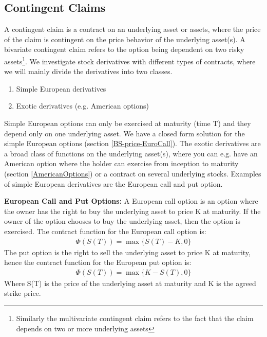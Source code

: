 
\subsection{Contingent Claims}
A contingent claim is a contract on an underlying asset or assets, where the price of the claim is contingent on the price behavior of the underlying asset(s). A bivariate contingent claim refers to the option being dependent on two risky assets\footnote{Similarly the multivariate contingent claim refers to the fact that the claim depends on two or more underlying assets}. We investigate stock derivatives with different types of contracts, where we will mainly divide the derivatives into two classes. 
\begin{enumerate}
\item Simple European derivatives
\item Exotic derivatives (e.g. American options)
\end{enumerate}
Simple European options can only be exercised at maturity (time T) and they depend only on one underlying asset. We have a closed form solution for the simple European options (section \ref{BS-price-EuroCall}). The exotic derivatives are a broad class of functions on the underlying asset(s), where you can e.g. have an American option where the holder can exercise from inception to maturity (section \ref{AmericanOptions}) or a contract on several underlying stocks. Examples of simple European derivatives are the European call and put option.

\theoremstyle{definition}
\begin{definition}{\textbf{European Call and Put Options:}}\label{def:CallOptions}
A European call option is an option where the owner has the right to buy the underlying asset to price K at maturity. If the owner of the option chooses to buy the underlying asset, then the option is exercised. The contract function for the European call option is:
\begin{equation*}
\begin{split}
\Phi(S(T))=\max\{S(T)-K, 0\}
\end{split}
\end{equation*}
The put option is the right to sell the underlying asset to price K at maturity, hence the contract function for the European put option is:
\begin{equation*}
\begin{split}
\Phi(S(T))=\max\{K-S(T), 0\}
\end{split}
\end{equation*}
Where S(T) is the price of the underlying asset at maturity and K is the agreed strike price.
\end{definition}

